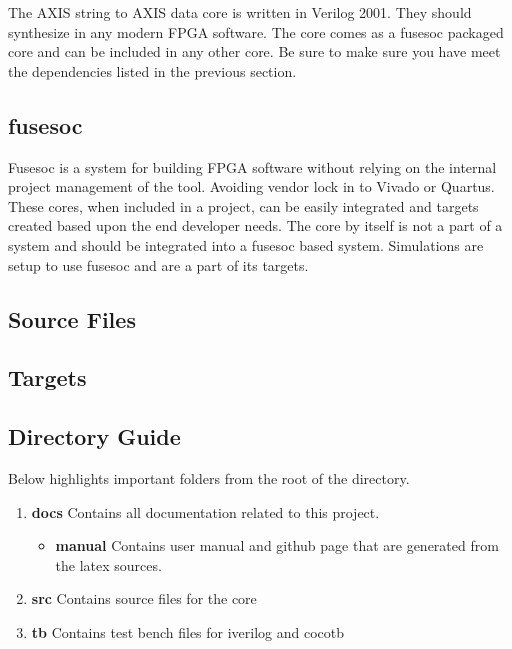\par
The AXIS string to AXIS data core is written in Verilog 2001. They should synthesize in any modern FPGA software. The core comes as a fusesoc packaged core and can be
included in any other core. Be sure to make sure you have meet the dependencies listed in the previous section.

\subsection{fusesoc}
\par
Fusesoc is a system for building FPGA software without relying on the internal project management of the tool. Avoiding vendor lock in to Vivado or Quartus.
These cores, when included in a project, can be easily integrated and targets created based upon the end developer needs. The core by itself is not a part of
a system and should be integrated into a fusesoc based system. Simulations are setup to use fusesoc and are a part of its targets.

\subsection{Source Files}



\subsection{Targets}



\subsection{Directory Guide}

\par
Below highlights important folders from the root of the directory.

\begin{enumerate}
  \item \textbf{docs} Contains all documentation related to this project.
    \begin{itemize}
      \item \textbf{manual} Contains user manual and github page that are generated from the latex sources.
    \end{itemize}
  \item \textbf{src} Contains source files for the core
  \item \textbf{tb} Contains test bench files for iverilog and cocotb
\end{enumerate}

